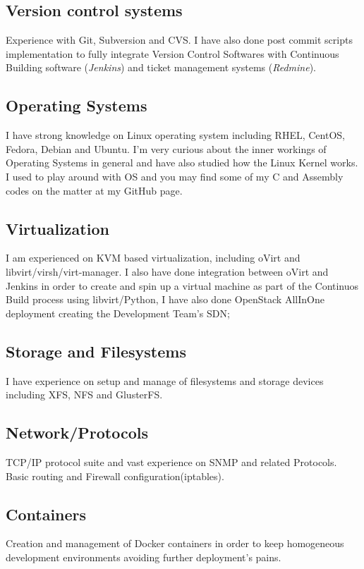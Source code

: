 \documentclass{article}
\begin{document}
\begin{multicols}{2}
\subsection{Version control systems}
Experience with Git, Subversion and CVS. I have also done post commit scripts
implementation to fully integrate Version Control Softwares with Continuous
Building software (\textit{Jenkins}) and ticket management systems 
(\textit{Redmine}). 

\subsection{Operating Systems}
I have strong knowledge on Linux operating system including RHEL, CentOS,
Fedora, Debian and Ubuntu. I'm very curious about the inner workings of 
Operating Systems in general and have also studied how the Linux Kernel
works. I used to play around with OS and you may find some of my C and
Assembly codes on the matter at my GitHub page.

\subsection{Virtualization}
I am experienced on KVM based virtualization, including oVirt
and libvirt/virsh/virt-manager. I also have done integration between oVirt
and Jenkins in order to create and spin up a virtual machine as part of 
the Continuos Build process using libvirt/Python, I have also done OpenStack
AllInOne deployment creating the Development Team's SDN;

\subsection{Storage and Filesystems}
I have experience on setup and manage of filesystems and storage devices
including XFS, NFS and GlusterFS.

\subsection{Network/Protocols}
TCP/IP protocol suite and vast experience on SNMP and related Protocols. Basic 
routing and Firewall configuration(iptables).

\subsection{Containers}
Creation and management of Docker containers in order to keep
homogeneous development environments avoiding further deployment's pains.


\end{multicols}
\end{document}
